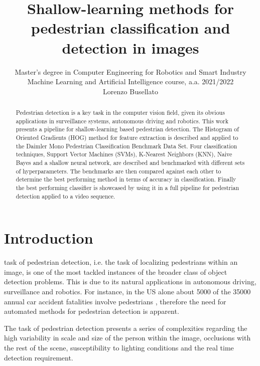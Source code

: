\documentclass[journal,twocolumn]{IEEEtran}
\begin{document}
\title{Shallow-learning methods for pedestrian classification and detection in images}

\author[1]{Master’s degree in Computer Engineering for Robotics and Smart Industry\\Machine Learning and Artificial Intelligence course, a.a. 2021/2022\\ Lorenzo Busellato}%
\onecolumn

\maketitle
\begin{abstract} Pedestrian detection is a key task in the computer vision field, given its obvious applications in surveillance systems, autonomous driving and robotics. 
This work presents a pipeline for shallow-learning based pedestrian detection. The Histogram of Oriented Gradients (HOG)
method for feature extraction is described and applied to the Daimler Mono Pedestrian Classification Benchmark Data Set. Four classification
techniques, Support Vector Machines (SVMs), K-Nearest Neighbors (KNN), Naive Bayes and a shallow neural network, are described and benchmarked
with different sets of hyperparameters. The benchmarks are then compared against each other to determine the best performing
method in terms of accuracy in classification. Finally the best performing classifier is showcased by using it in a full pipeline for pedestrian detection applied to a video sequence.
\end{abstract}
  \tableofcontents
  \clearpage
  \twocolumn

\IEEEpeerreviewmaketitle

\section{Introduction}
 task of pedestrian detection, i.e. the task of localizing pedestrians within an image, is one of the most tackled
instances of the broader class of object detection problems.
This is due to its natural applications in autonomous driving,
surveillance and robotics. For instance, in the US alone about
5000 of the 35000 annual car accident fatalities involve
pedestrians \cite{1}, therefore the need for automated methods for
pedestrian detection is apparent.

The task of pedestrian detection presents a series of complexities regarding the high variability in scale and size of the
person within the image, occlusions with the rest of the scene,
susceptibility to lighting conditions and the real time detection
requirement.
\end{document}
